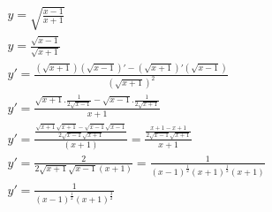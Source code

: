 \begin{ex}
\begin{align}
&y=\sqrt{\frac{x-1}{x+1}}\nonumber\\
&y=\frac{\sqrt{x-1}}{\sqrt{x+1}}\nonumber\\
&y'=\frac{(\sqrt{x+1})(\sqrt{x-1})'-(\sqrt{x+1})'(\sqrt{x-1})}{(\sqrt{x+1})^2}\nonumber\\
&y'=\frac{\sqrt{x+1}.\frac{1}{2\sqrt{x-1}}-\sqrt{x-1}.\frac{1}{2\sqrt{x+1}}}{x+1}\nonumber\\
&y'=\frac{\frac{\sqrt{x+1}\sqrt{x+1}-\sqrt{x-1}\sqrt{x-1}}{2\sqrt{x-1}\sqrt{x+1}}}{(x+1)}=\frac{\frac{x+1-x+1}{2\sqrt{x-1}{\sqrt{x+1}}}}{x+1}\nonumber\\
&y'=\frac{2}{2\sqrt{x+1}{\sqrt{x-1}(x+1)}}=\frac{1}{(x-1)^\frac{1}{2}(x+1)^\frac{1}{2}(x+1)}\nonumber\\
&y'=\frac{1}{(x-1)^\frac{1}{2}(x+1)^\frac{3}{2}}\nonumber
\end{align}
\end{ex}